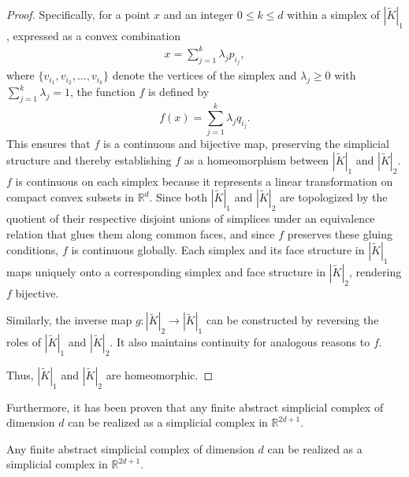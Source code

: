 \begin{proof}
	Specifically, for a point $x$ and an integer $0 \leq k \leq d$ within a simplex of $|\tilde{K}|_{1}$, expressed
	as a convex combination
	\begin{align}
		x = \sum_{j=1}^{k}\lambda_{j} p_{i_j},
	\end{align}
	where $\{v_{i_1}, v_{i_2}, \ldots, v_{i_k}\}$ denote the vertices of the simplex
	and $\lambda_{j} \geq 0$ with $\sum_{j=1}^{k}\lambda_{j} = 1$, the function
	$f$ is defined by
	\[
		f(x) = \sum_{j=1}^{k}\lambda_{j} q_{i_j}.
	\]
	This ensures that $f$ is a continuous and bijective map, preserving
	the simplicial structure and thereby establishing $f$ as a homeomorphism between
	$|\tilde{K}|_{1}$ and $|\tilde{K}|_{2}$. $f$ is continuous on each simplex because it represents a linear transformation
	on compact convex subsets in $\mathbb{R}^{d}$. Since both $|\tilde{K}|_{1}$
	and $|\tilde{K}|_{2}$ are topologized by the quotient of their respective
	disjoint unions of simplices under an equivalence relation that glues them
	along common faces, and since $f$ preserves these gluing conditions, $f$ is
	continuous globally. Each simplex and its face structure in $|\tilde{K}|_{1}$ maps
	uniquely onto a corresponding simplex and face structure in $|\tilde{K}|_{2}$,
	rendering $f$ bijective.

	Similarly, the inverse map $g: |\tilde{K}|_{2} \to |\tilde{K}|_{1}$ can be constructed
	by reversing the roles of $|\tilde{K}|_{1}$ and $|\tilde{K}|_{2}$. It also
	maintains continuity for analogous reasons to $f$.

	Thus, $|\tilde{K}|_{1}$ and $|\tilde{K}|_{2}$ are homeomorphic.
\end{proof}

Furthermore, it has been proven that any finite abstract simplicial complex of dimension
$d$ can be realized as a simplicial complex in $\mathbb{R}^{2d+1}$.

\begin{theorem}
	Any finite abstract simplicial complex of dimension $d$ can be realized as a simplicial
	complex in $\mathbb{R}^{2d+1}$.
\end{theorem}

